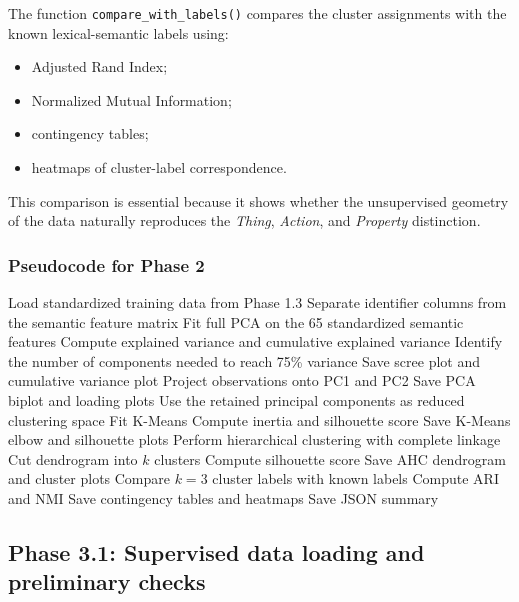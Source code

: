 \documentclass{ipgpmaster}
\begin{document}
The function \texttt{compare\_with\_labels()} compares the cluster assignments with the known lexical-semantic labels using:

\begin{itemize}
    \item Adjusted Rand Index;
    \item Normalized Mutual Information;
    \item contingency tables;
    \item heatmaps of cluster-label correspondence.
\end{itemize}

This comparison is essential because it shows whether the unsupervised geometry of the data naturally reproduces the \emph{Thing}, \emph{Action}, and \emph{Property} distinction.

\subsubsection{Pseudocode for Phase 2}

\begin{algorithm}[H]
\caption{Phase 2: Unsupervised exploration}
\begin{algorithmic}[1]
\State Load standardized training data from Phase 1.3
\State Separate identifier columns from the semantic feature matrix
\State Fit full PCA on the 65 standardized semantic features
\State Compute explained variance and cumulative explained variance
\State Identify the number of components needed to reach 75\% variance
\State Save scree plot and cumulative variance plot
\State Project observations onto PC1 and PC2
\State Save PCA biplot and loading plots
\State Use the retained principal components as reduced clustering space
    \State Fit K-Means
    \State Compute inertia and silhouette score
\EndFor
\State Save K-Means elbow and silhouette plots
\State Perform hierarchical clustering with complete linkage
    \State Cut dendrogram into \(k\) clusters
    \State Compute silhouette score
\EndFor
\State Save AHC dendrogram and cluster plots
\State Compare \(k=3\) cluster labels with known labels
\State Compute ARI and NMI
\State Save contingency tables and heatmaps
\State Save JSON summary
\end{algorithmic}
\end{algorithm}

\subsection{Phase 3.1: Supervised data loading and preliminary checks}
\end{document}
